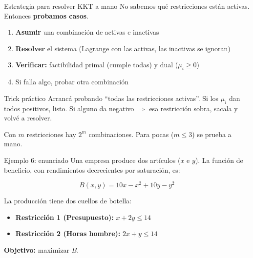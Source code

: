 \documentclass{beamer}
\begin{document}
\begin{frame}{Estrategia para resolver KKT a mano}
    \small
    No sabemos qué restricciones están activas. Entonces \textbf{probamos casos}.

    \vspace{0.3em}

    \begin{enumerate}
        \item \textbf{Asumir} una combinación de activas e inactivas
        \item \textbf{Resolver} el sistema (Lagrange con las activas, las inactivas se ignoran)
        \item \textbf{Verificar:} factibilidad primal (cumple todas) y dual ($\mu_i \geq 0$)
        \item Si falla algo, probar otra combinación
    \end{enumerate}

    \vspace{0.3em}

    \begin{alertblock}{Trick práctico}
        Arrancá probando ``todas las restricciones activas''. Si los $\mu_i$ dan todos positivos, listo. Si alguno da negativo $\Rightarrow$ esa restricción sobra, sacala y volvé a resolver.
    \end{alertblock}

    Con $m$ restricciones hay $2^m$ combinaciones. Para pocas ($m \leq 3$) se prueba a mano.
\end{frame}


\begin{frame}{Ejemplo 6: enunciado}
    \small
    Una empresa produce dos artículos ($x$ e $y$). La función de beneficio, con rendimientos decrecientes por saturación, es:

    \[
    B(x, y) = 10x - x^2 + 10y - y^2
    \]

    \vspace{0.5em}

    La producción tiene dos cuellos de botella:

    \begin{itemize}
        \item \textbf{Restricción 1 (Presupuesto):} $x + 2y \leq 14$
        \item \textbf{Restricción 2 (Horas hombre):} $2x + y \leq 14$
    \end{itemize}

    \vspace{0.5em}

    \textbf{Objetivo:} maximizar $B$.
\end{frame}
\end{document}
